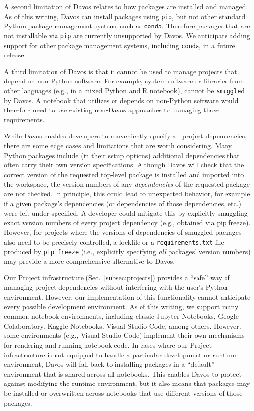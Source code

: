 \documentclass[preprint,12pt,a4paper]{elsarticle}
\begin{document}
A second limitation of Davos relates to how packages are installed and managed.
As of this writing, Davos can install packages using \texttt{pip}, but not
other standard Python package management systems such as \texttt{conda}.
Therefore packages that are not installable via \texttt{pip} are currently
unsupported by Davos. We anticipate adding support for other package management
systems, including \texttt{conda}, in a future release.

A third limitation of Davos is that it cannot be used to manage projects that
depend on non-Python software. For example, system software or libraries from
other languages (e.g., in a mixed Python and R notebook), cannot be
\texttt{smuggle}d by Davos. A notebook that utilizes or depends on non-Python
software would therefore need to use existing non-Davos approaches to managing
those requirements.

While Davos enables developers to conveniently specify all project
dependencies, there are some edge cases and limitations that are worth
considering. Many Python packages include (in their setup options) additional
dependencies that often carry their own version specifications. Although Davos
will check that the correct version of the requested top-level package is
installed and imported into the workspace, the version numbers of any
\textit{dependencies} of the requested package are not checked. In principle,
this could lead to unexpected behavior, for example if a given package's
dependencies (or dependencies of those dependencies, etc.) were left
under-specified. A developer could mitigate this by explicitly smuggling exact
version numbers of every project dependency (e.g., obtained via pip freeze).
However, for projects where the versions of dependencies of smuggled packages
also need to be precisely controlled, a lockfile or a \texttt{requirements.txt}
file produced by \texttt{pip freeze} (i.e., explicitly specifying \textit{all} packages'
version numbers) may provide a more comprehensive alternative to Davos.

Our Project infrastructure (Sec.~\ref{subsec:projects}) provides a ``safe'' way
of managing project dependencies without interfering with the user's Python
environment. However, our implementation of this functionality cannot
anticipate every possible development environment. As of this writing, we
support many common notebook environments, including classic Jupyter Notebooks,
Google Colaboratory, Kaggle Notebooks, Visual Studio Code, among others.
However, some environments (e.g., Visual Studio Code) implement their own
mechanisms for rendering and running notebook code. In cases where our Project
infrastructure is not equipped to handle a particular development or runtime
environment, Davos will fall back to installing packages in a ``default''
environment that is shared across all notebooks.  This enables Davos to protect against
modifying the runtime environment, but it also means that packages may be installed
or overwritten across notebooks that use different versions of those packages.
\end{document}
